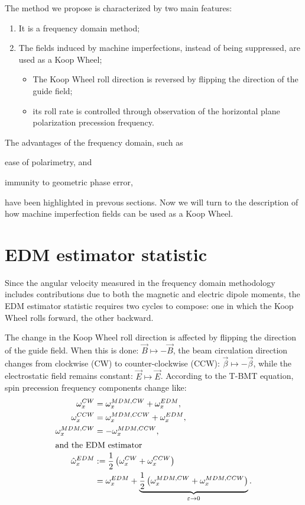 \documentclass[a4paper]{jacow}
\newcommand{\w}{\omega}
\begin{document}
The method we propose is characterized by two main features:
\begin{enumerate}
\item It is a frequency domain method;
\item The fields induced by machine imperfections, instead of being suppressed,
  are used as a Koop Wheel;
  \begin{itemize}
  \item The Koop Wheel roll direction is reversed by flipping the direction of the guide field;
  \item its roll rate is controlled through observation of the horizontal plane
    polarization precession frequency.
  \end{itemize}
\end{enumerate}

The advantages of the frequency domain, such as
\begin{inparaenum}
\item ease of polarimetry, and
\item immunity to geometric phase error,
\end{inparaenum}
have been highlighted in prevous sections. Now we will turn to the description of how machine imperfection fields
can be used as a Koop Wheel.

\section{EDM estimator statistic}
Since the angular velocity measured in the frequency domain methodology includes contributions due to both the
magnetic and electric dipole moments, the EDM estimator statistic requires two cycles to compose:
one in which the Koop Wheel rolls forward, the other backward.

The change in the Koop Wheel roll direction is affected by flipping the direction of the guide field.
When this is done:
$\vec B \mapsto -\vec B$, the beam circulation direction changes from clockwise (CW) to counter-clockwise (CCW): 
$\vec\beta \mapsto -\vec\beta$, while the electrostatic field remains constant: $\vec E \mapsto \vec E$.
According to the T-BMT equation, spin precession frequency components change like:
\begin{subequations}
  \begin{align}
    \w_x^{CW} &= \w_x^{MDM, CW}   + \w_x^{EDM}, \notag\\
    \w_x^{CCW} &= \w_x^{MDM, CCW} + \w_x^{EDM}, \notag\\
    \w_x^{MDM, CW} &= -\w_x^{MDM, CCW}, \label{eq:CW_CCW_MDM}\\
    \intertext{and the EDM estimator}
    \hat\w_x^{EDM} &:= \frac12\bkt{\w_x^{CW} + \w_x^{CCW}} \label{eq:FDM_estimator} \\
                  &=  \w_x^{EDM} +
          \underbrace{\frac12\bkt{\w_x^{MDM, CW} + \w_x^{MDM, CCW}}}_{\varepsilon \to 0}.
  \end{align}
\end{subequations}
\end{document}
